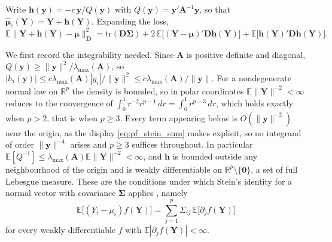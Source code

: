 \documentclass[a4paper,fleqn]{cas-sc}
\theoremstyle{plain}
\theoremstyle{definition}
\theoremstyle{remark}
\newcommand{\tr}{\mathrm{tr}}
\newcommand{\E}{\mathbb{E}}
\newcommand{\Real}{\mathbb{R}}
\begin{document}
\begin{appendices}
Write $\bm h(\bm y)=-c\,\bm y/Q(\bm y)$ with $Q(\bm y)=\bm y'\bm A^{-1}\bm y$, so that $\hat{\bm\mu}_c(\bm Y)=\bm Y+\bm h(\bm Y)$. Expanding the loss,
\begin{equation}
\label{eq:pf_expand}
\E\bigl\|\bm Y+\bm h(\bm Y)-\bm\mu\bigr\|^2_{\bm D}
=
\tr(\bm D\bm\Sigma)
+2\,\E\bigl[(\bm Y-\bm\mu)'\bm D\bm h(\bm Y)\bigr]
+\E\bigl[\bm h(\bm Y)'\bm D\bm h(\bm Y)\bigr].
\end{equation}

We first record the integrability needed. Since $\bm A$ is positive definite and diagonal, $Q(\bm y)\ge\|\bm y\|^2/\lambda_{\max}(\bm A)$, so $|h_i(\bm y)|\le c\lambda_{\max}(\bm A)|y_i|/\|\bm y\|^2\le c\lambda_{\max}(\bm A)/\|\bm y\|$. For a nondegenerate normal law on $\Real^p$ the density is bounded, so in polar coordinates $\E\|\bm Y\|^{-2}<\infty$ reduces to the convergence of $\int_0^{1}r^{-2}r^{p-1}\,dr=\int_0^{1}r^{p-3}\,dr$, which holds exactly when $p>2$, that is when $p\ge3$. Every term appearing below is $O(\|\bm y\|^{-2})$ near the origin, as the display \eqref{eq:pf_stein_sum} makes explicit, so no integrand of order $\|\bm y\|^{-4}$ arises and $p\ge3$ suffices throughout. In particular $\E[Q^{-1}]\le\lambda_{\max}(\bm A)\E\|\bm Y\|^{-2}<\infty$, and $\bm h$ is bounded outside any neighbourhood of the origin and is weakly differentiable on $\Real^p\setminus\{\bm 0\}$, a set of full Lebesgue measure. These are the conditions under which Stein's identity for a normal vector with covariance $\bm\Sigma$ applies \citep{stein1981, fourdrinier2018}, namely
\begin{equation}
\label{eq:pf_stein}
\E\bigl[(Y_i-\mu_i)f(\bm Y)\bigr]
=
\sum_{j=1}^{p}\Sigma_{ij}\,\E\bigl[\partial_jf(\bm Y)\bigr]
\end{equation}
for every weakly differentiable $f$ with $\E|\partial_jf(\bm Y)|<\infty$.


\end{appendices}
\end{document}
